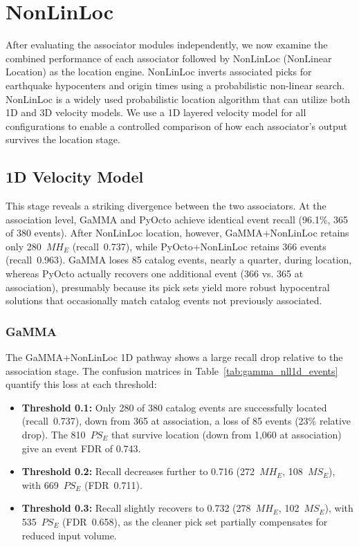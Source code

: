 \newpage
\section{NonLinLoc}
\label{sec:nonlinloc}
After evaluating the associator modules independently, we now examine the
combined performance of each associator followed by NonLinLoc (NonLinear
Location) as the location engine. NonLinLoc inverts associated picks for
earthquake hypocenters and origin times using a probabilistic non-linear
search. NonLinLoc is a widely used probabilistic location algorithm that can
utilize both 1D and 3D velocity models. We use a 1D layered velocity model for
all configurations to enable a controlled comparison of how each associator's
output survives the location stage.

\subsection{1D Velocity Model}
This stage reveals a striking divergence between the two associators. At the
association level, GaMMA and PyOcto achieve identical event recall (96.1\%,
365 of 380 events). After NonLinLoc location, however, GaMMA+NonLinLoc retains
only 280~$MH_E$ (recall~0.737), while PyOcto+NonLinLoc retains 366
events (recall~0.963). GaMMA loses 85 catalog events, nearly a quarter, during
location, whereas PyOcto actually recovers one additional event (366 vs. 365 at
association), presumably because its pick sets yield more robust hypocentral
solutions that occasionally match catalog events not previously associated.

\subsubsection{GaMMA}
The GaMMA+NonLinLoc 1D pathway shows a large recall drop relative to the
association stage. The confusion matrices in Table~\ref{tab:gamma_nll1d_events}
quantify this loss at each threshold:
\begin{itemize}
  \item \textbf{Threshold 0.1:} Only 280 of 380 catalog events are successfully
    located (recall~0.737), down from 365 at association, a loss of
    85 events (23\% relative drop). The 810~$PS_E$ that
    survive location (down from 1,060 at association) give an event \ac{FDR} of
    0.743.
  \item \textbf{Threshold 0.2:} Recall decreases further to 0.716 (272~$MH_E$,
    108~$MS_E$), with 669~$PS_E$ (\ac{FDR}~0.711).
  \item \textbf{Threshold 0.3:} Recall slightly recovers to 0.732 (278~$MH_E$,
    102~$MS_E$), with 535~$PS_E$ (\ac{FDR}~0.658), as the cleaner pick set
    partially compensates for reduced input volume.
\end{itemize}

